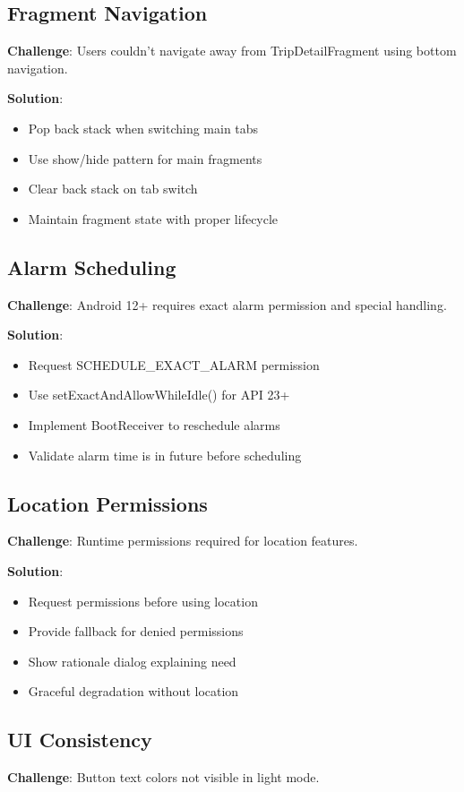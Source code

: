 \documentclass[12pt,a4paper]{article}
\begin{document}
\subsection{Fragment Navigation}
\textbf{Challenge}: Users couldn't navigate away from TripDetailFragment using bottom navigation.

\textbf{Solution}:
\begin{itemize}
    \item Pop back stack when switching main tabs
    \item Use show/hide pattern for main fragments
    \item Clear back stack on tab switch
    \item Maintain fragment state with proper lifecycle
\end{itemize}

\subsection{Alarm Scheduling}
\textbf{Challenge}: Android 12+ requires exact alarm permission and special handling.

\textbf{Solution}:
\begin{itemize}
    \item Request SCHEDULE\_EXACT\_ALARM permission
    \item Use setExactAndAllowWhileIdle() for API 23+
    \item Implement BootReceiver to reschedule alarms
    \item Validate alarm time is in future before scheduling
\end{itemize}

\subsection{Location Permissions}
\textbf{Challenge}: Runtime permissions required for location features.

\textbf{Solution}:
\begin{itemize}
    \item Request permissions before using location
    \item Provide fallback for denied permissions
    \item Show rationale dialog explaining need
    \item Graceful degradation without location
\end{itemize}

\subsection{UI Consistency}
\textbf{Challenge}: Button text colors not visible in light mode.
\end{document}

